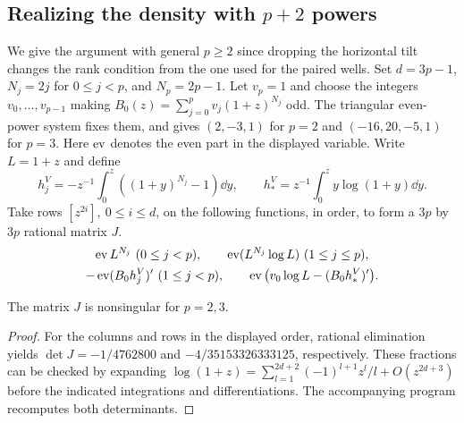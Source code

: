 \subsection{Realizing the density with \texorpdfstring{\(p+2\)}{p+2} powers}
We give the argument with general \(p\ge2\) since dropping the horizontal
tilt changes the rank condition from the one used for the paired wells.
Set \(d=3p-1\), \(N_j=2j\) for \(0\le j<p\), and \(N_p=2p-1\).
Let \(v_p=1\) and choose the integers \(v_0,\ldots,v_{p-1}\) making
\(B_0(z)=\sum_{j=0}^p v_j(1+z)^{N_j}\) odd. The triangular even-power
system fixes them, and gives \((2,-3,1)\) for \(p=2\) and \((-16,20,-5,1)\) for \(p=3\).
Here \(\operatorname{ev}\) denotes the even part in the displayed variable. Write
\(L=1+z\) and define
\[
 h_j^V=-z^{-1}\int_0^z((1+y)^{N_j}-1)\dd y,\qquad
 h_*^V=z^{-1}\int_0^z y\log(1+y)\dd y.
\]
Take rows \([z^{2i}],\ 0\le i\le d\), on the following functions, in order,
to form a \(3p\) by \(3p\) rational matrix \(J\).
\begin{gather}
 \operatorname{ev} L^{N_j}\ (0\le j<p),\qquad
 \operatorname{ev}(L^{N_j}\log L)\ (1\le j\le p),\notag\\
 -\operatorname{ev}(B_0h_j^V)'\ (1\le j<p),\qquad
 \operatorname{ev}\big(v_0\log L-(B_0h_*^V)'\big).                              \label{se:vertical}
\end{gather}

\begin{lemma}\label{se:rankv}
The matrix \(J\) is nonsingular for \(p=2,3\).
\end{lemma}
\begin{proof}
For the columns and rows in the displayed order, rational elimination yields \(\det J=-1/4762800\) and \(-4/35153326333125\), respectively. These fractions can be checked by expanding \(\log(1+z)=\sum_{l=1}^{2d+2}(-1)^{l+1}z^l/l+O(z^{2d+3})\) before the indicated integrations and differentiations. The accompanying program recomputes both determinants.
\end{proof}

